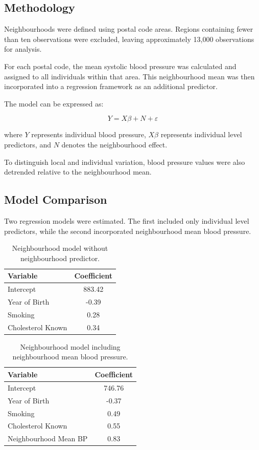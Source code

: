 \documentclass[12pt,a4paper]{article}
\begin{document}
\subsection{Methodology}

Neighbourhoods were defined using postal code areas. Regions containing fewer than ten observations were excluded, leaving approximately 13,000 observations for analysis.

For each postal code, the mean systolic blood pressure was calculated and assigned to all individuals within that area. This neighbourhood mean was then incorporated into a regression framework as an additional predictor.

The model can be expressed as:

\[
Y = X\beta + N + \varepsilon
\]

where \(Y\) represents individual blood pressure, \(X\beta\) represents individual level predictors, and \(N\) denotes the neighbourhood effect.

To distinguish local and individual variation, blood pressure values were also detrended relative to the neighbourhood mean.

\subsection{Model Comparison}

Two regression models were estimated. The first included only individual level predictors, while the second incorporated neighbourhood mean blood pressure.

\begin{table}[H]
\centering
\caption{Neighbourhood model without neighbourhood predictor.}
\label{tab:neighbourhood_model1}
\begin{tabular}{lc}
\toprule
Variable & Coefficient \\
\midrule
Intercept & 883.42 \\
Year of Birth & -0.39 \\
Smoking & 0.28 \\
Cholesterol Known & 0.34 \\
\bottomrule
\end{tabular}
\end{table}

\begin{table}[H]
\centering
\caption{Neighbourhood model including neighbourhood mean blood pressure.}
\label{tab:neighbourhood_model2}
\begin{tabular}{lc}
\toprule
Variable & Coefficient \\
\midrule
Intercept & 746.76 \\
Year of Birth & -0.37 \\
Smoking & 0.49 \\
Cholesterol Known & 0.55 \\
Neighbourhood Mean BP & 0.83 \\
\bottomrule
\end{tabular}
\end{table}
\end{document}

